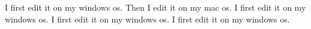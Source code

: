 I first edit it on my windows os.
Then I edit it on my mac os.
I first edit it on my windows os.
I first edit it on my windows os.
I first edit it on my windows os.
